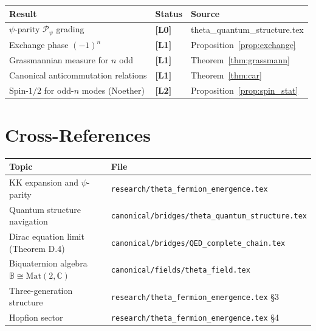 \documentclass[11pt,a4paper]{article}
\newcommand{\Lzero}{\textbf{[L0]}}
\newcommand{\Lone}{\textbf{[L1]}}
\newcommand{\Ltwo}{\textbf{[L2]}}
\begin{document}
\begin{center}
\begin{tabular}{lll}
\hline
Result & Status & Source \\
\hline
$\psi$-parity $\mathcal{P}_\psi$ grading & \Lzero & theta\_quantum\_structure.tex\\
Exchange phase $(-1)^n$ & \Lone & Proposition~\ref{prop:exchange} \\
Grassmannian measure for $n$ odd & \Lone & Theorem~\ref{thm:grassmann} \\
Canonical anticommutation relations & \Lone & Theorem~\ref{thm:car} \\
Spin-$1/2$ for odd-$n$ modes (Noether) & \Ltwo & Proposition~\ref{prop:spin_stat} \\
\hline
\end{tabular}
\end{center}

\section{Cross-References}
\label{sec:xref}

\begin{tabular}{ll}
\hline
Topic & File \\
\hline
KK expansion and $\psi$-parity & \texttt{research/theta\_fermion\_emergence.tex} \\
Quantum structure navigation & \texttt{canonical/bridges/theta\_quantum\_structure.tex} \\
Dirac equation limit (Theorem D.4) & \texttt{canonical/bridges/QED\_complete\_chain.tex} \\
Biquaternion algebra $\mathbb{B}\cong\mathrm{Mat}(2,\mathbb{C})$
  & \texttt{canonical/fields/theta\_field.tex} \\
Three-generation structure & \texttt{research/theta\_fermion\_emergence.tex} §3 \\
Hopfion sector & \texttt{research/theta\_fermion\_emergence.tex} §4 \\
\hline
\end{tabular}
\end{document}

